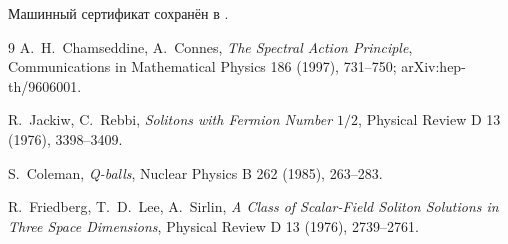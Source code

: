 Машинный сертификат сохранён в
.

\begin{thebibliography}{9}
A.~H.~Chamseddine, A.~Connes,
\emph{The Spectral Action Principle},
Communications in Mathematical Physics 186 (1997), 731--750;
arXiv:hep-th/9606001.

R.~Jackiw, C.~Rebbi,
\emph{Solitons with Fermion Number $1/2$},
Physical Review D 13 (1976), 3398--3409.

S.~Coleman, \emph{Q-balls},
Nuclear Physics B 262 (1985), 263--283.

R.~Friedberg, T.~D.~Lee, A.~Sirlin,
\emph{A Class of Scalar-Field Soliton Solutions in Three Space Dimensions},
Physical Review D 13 (1976), 2739--2761.
\end{thebibliography}